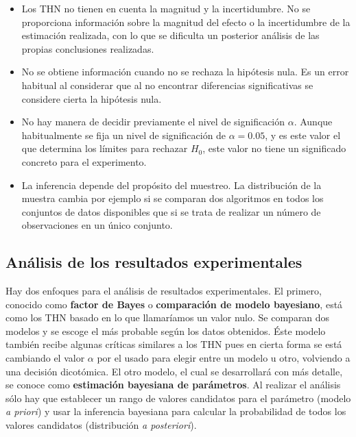\begin{itemize}
\item Los THN no tienen en cuenta la magnitud y la 
	incertidumbre. No se proporciona información sobre la 
	magnitud del efecto o la incertidumbre de la estimación
	realizada, con lo que se dificulta un posterior análisis
	de las propias conclusiones realizadas.
\item No se obtiene información cuando no se rechaza la
	hipótesis nula. Es un error habitual al considerar 
	que al no encontrar diferencias significativas se
	considere cierta la hipótesis nula. 
\item No hay manera de decidir previamente el nivel 
	de significación $\alpha$. Aunque habitualmente se 
	fija un nivel de significación de $\alpha = 0.05$, y es
	este valor el que determina los límites para rechazar 
	$H_0$, este valor no tiene un significado concreto para
	el experimento. 
\item La inferencia depende del propósito del muestreo. 
	La distribución de la muestra cambia por ejemplo si
	se comparan dos algoritmos en todos los conjuntos de
	datos disponibles que si se trata de realizar un 
	número de observaciones en un único conjunto.
\end{itemize}
	
\subsection{Análisis de los resultados experimentales}

	Hay dos enfoques para el análisis de resultados 
experimentales. El primero, conocido como \textbf{factor de 
Bayes} o \textbf{comparación de modelo bayesiano}, está como 
los THN basado en lo que llamaríamos un valor nulo. Se 
comparan dos modelos y se escoge el más probable según los 
datos obtenidos. Éste modelo también recibe algunas críticas
similares a los THN pues en cierta forma se está cambiando el
valor $\alpha$ por el usado para elegir entre un modelo u 
otro, volviendo a una decisión dicotómica. El otro modelo, el 
cual se desarrollará con más detalle, se conoce como 
\textbf{estimación bayesiana de parámetros}. Al realizar
el análisis sólo hay que establecer un rango de valores 
candidatos para el parámetro (modelo \textit{a priori}) 
y usar la inferencia bayesiana para calcular la probabilidad
de todos los valores candidatos (distribución \textit{a 
posteriori}).\\

